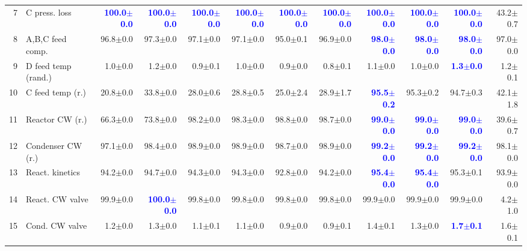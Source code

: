 \begin{table}[t]
\begin{tabular}{r l  r r r r r r r r r r}
7 & C press. loss & \textcolor{blue}{\textbf{100.0$\pm$0.0}} & \textcolor{blue}{\textbf{100.0$\pm$0.0}} & \textcolor{blue}{\textbf{100.0$\pm$0.0}} & \textcolor{blue}{\textbf{100.0$\pm$0.0}} & \textcolor{blue}{\textbf{100.0$\pm$0.0}} & \textcolor{blue}{\textbf{100.0$\pm$0.0}} & \textcolor{blue}{\textbf{100.0$\pm$0.0}} & \textcolor{blue}{\textbf{100.0$\pm$0.0}} & \textcolor{blue}{\textbf{100.0$\pm$0.0}} & 43.2$\pm$0.7 \\
8 & A,B,C feed comp. & 96.8$\pm$0.0 & 97.3$\pm$0.0 & 97.1$\pm$0.0 & 97.1$\pm$0.0 & 95.0$\pm$0.1 & 96.9$\pm$0.0 & \textcolor{blue}{\textbf{98.0$\pm$0.0}} & \textcolor{blue}{\textbf{98.0$\pm$0.0}} & \textcolor{blue}{\textbf{98.0$\pm$0.0}} & 97.0$\pm$0.0 \\
\rowcolor{gray!15}9 & D feed temp (rand.) & 1.0$\pm$0.0 & 1.2$\pm$0.0 & 0.9$\pm$0.1 & 1.0$\pm$0.0 & 0.9$\pm$0.0 & 0.8$\pm$0.1 & 1.1$\pm$0.0 & 1.0$\pm$0.0 & \textcolor{blue}{\textbf{1.3$\pm$0.0}} & 1.2$\pm$0.1 \\
10 & C feed temp (r.) & 20.8$\pm$0.0 & 33.8$\pm$0.0 & 28.0$\pm$0.6 & 28.8$\pm$0.5 & 25.0$\pm$2.4 & 28.9$\pm$1.7 & \textcolor{blue}{\textbf{95.5$\pm$0.2}} & 95.3$\pm$0.2 & 94.7$\pm$0.3 & 42.1$\pm$1.8 \\
11 & Reactor CW (r.) & 66.3$\pm$0.0 & 73.8$\pm$0.0 & 98.2$\pm$0.0 & 98.3$\pm$0.0 & 98.8$\pm$0.0 & 98.7$\pm$0.0 & \textcolor{blue}{\textbf{99.0$\pm$0.0}} & \textcolor{blue}{\textbf{99.0$\pm$0.0}} & \textcolor{blue}{\textbf{99.0$\pm$0.0}} & 39.6$\pm$0.7 \\
12 & Condenser CW (r.) & 97.1$\pm$0.0 & 98.4$\pm$0.0 & 98.9$\pm$0.0 & 98.9$\pm$0.0 & 98.7$\pm$0.0 & 98.9$\pm$0.0 & \textcolor{blue}{\textbf{99.2$\pm$0.0}} & \textcolor{blue}{\textbf{99.2$\pm$0.0}} & \textcolor{blue}{\textbf{99.2$\pm$0.0}} & 98.1$\pm$0.0 \\
13 & React. kinetics & 94.2$\pm$0.0 & 94.7$\pm$0.0 & 94.3$\pm$0.0 & 94.3$\pm$0.0 & 92.8$\pm$0.0 & 94.2$\pm$0.0 & \textcolor{blue}{\textbf{95.4$\pm$0.0}} & \textcolor{blue}{\textbf{95.4$\pm$0.0}} & 95.3$\pm$0.1 & 93.9$\pm$0.0 \\
14 & React. CW valve & 99.9$\pm$0.0 & \textcolor{blue}{\textbf{100.0$\pm$0.0}} & 99.8$\pm$0.0 & 99.8$\pm$0.0 & 99.8$\pm$0.0 & 99.8$\pm$0.0 & 99.9$\pm$0.0 & 99.9$\pm$0.0 & 99.9$\pm$0.0 & 4.2$\pm$1.0 \\
\rowcolor{gray!15}15 & Cond. CW valve & 1.2$\pm$0.0 & 1.3$\pm$0.0 & 1.1$\pm$0.1 & 1.1$\pm$0.0 & 0.9$\pm$0.0 & 0.9$\pm$0.1 & 1.4$\pm$0.1 & 1.3$\pm$0.0 & \textcolor{blue}{\textbf{1.7$\pm$0.1}} & 1.6$\pm$0.1 \\

\end{tabular}
\end{table}
